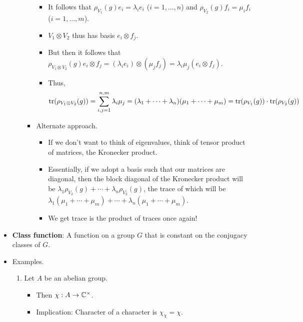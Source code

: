 \documentclass[../notes.tex]{subfiles}
\begin{document}
\begin{itemize}
\begin{enumerate}[resume]
\begin{itemize}
\begin{itemize}
                \item It follows that $\rho_{V_1}(g)e_i=\lambda_ie_i$ ($i=1,\dots,n$) and $\rho_{V_2}(g)f_i=\mu_if_i$ ($i=1,\dots,m$).
                \item $V_1\otimes V_2$ thus has basis $e_i\otimes f_j$.
                \item But then it follows that $\rho_{V_1\otimes V_2}(g)e_i\otimes f_j=(\lambda_ie_i)\otimes(\mu_jf_j)=\lambda_i\mu_j(e_i\otimes f_j)$.
                \item Thus,
                \begin{equation*}
                    \tr(\rho_{V_1\otimes V_2}(g)) = \sum_{i,j=1}^{n,m}\lambda_i\mu_j
                    = (\lambda_1+\cdots+\lambda_n)(\mu_1+\cdots+\mu_m)
                    = \tr(\rho_{V_1}(g))\cdot\tr(\rho_{V_2}(g))
                \end{equation*}
            \end{itemize}
            \item Alternate approach.
            \begin{itemize}
                \item If we don't want to think of eigenvalues, think of tensor product of matrices, the Kronecker product.
                \item Essentially, if we adopt a basis such that our matrices are diagonal, then the block diagonal of the Kronecker product will be $\lambda_1\rho_{V_2}(g)+\cdots+\lambda_n\rho_{V_2}(g)$, the trace of which will be $\lambda_1(\mu_1+\cdots+\mu_m)+\cdots+\lambda_n(\mu_1+\cdots+\mu_m)$.
                \item We get trace is the product of traces once again!
            \end{itemize}
        \end{itemize}
    \end{enumerate}
    \item \textbf{Class function}: A function on a group $G$ that is constant on the conjugacy classes of $G$.
    \item Examples.
    \begin{enumerate}
        \item Let $A$ be an abelian group.
        \begin{itemize}
            \item Then $\chi:A\to\mathbb{C}^\times$.
            \item Implication: Character of a character is $\chi_\chi=\chi$.
            \begin{itemize}

\end{itemize}
\end{itemize}
\end{enumerate}
\end{itemize}
\end{document}
